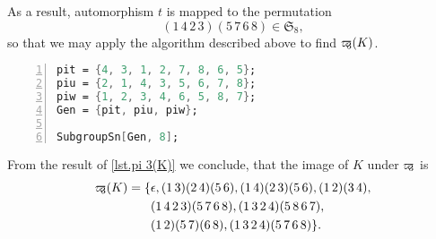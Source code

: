 As a result, automorphism $t$ is mapped to the permutation 
\begin{equation*}
(1\,4\,2\,3)(5\,7\,6\,8)\in\mathfrak{S}_8,
\end{equation*}
so that we may apply the algorithm described above to find $\varpi\hspace{-0.4em}_3(K)$.
\begin{lstlisting}[float, caption=Computing $\varpikern_3(K)\subseteq\mathfrak{S}_8$,
                   label=lst.pi 3(K),
                   language=Mathematica, 
                   numbers=left,
                   numberstyle=\tiny,
                   stepnumber=2,
                   numbersep=5pt]
pit = {4, 3, 1, 2, 7, 8, 6, 5};
piu = {2, 1, 4, 3, 5, 6, 7, 8};
piw = {1, 2, 3, 4, 6, 5, 8, 7};
Gen = {pit, piu, piw};

SubgroupSn[Gen, 8];
\end{lstlisting}
From the result of \cref{lst.pi 3(K)} we conclude, that the image of $K$ under $\varpi\hspace{-0.4em}_3$ is
\begin{align*}
\varpi\hspace{-0.4em}_3(K)=\lbrace	&\epsilon,(1\, 3)(2\, 4)(5\, 6), (1\, 4)(2\, 3)(5\, 6), (1\, 2)(3\, 4),   \\
									&(1\, 4\, 2\, 3)(5\, 7\, 6\, 8), (1\, 3\, 2\, 4)(5\, 8\, 6\, 7), \\
									&(1\, 2)(5\, 7)(6\, 8),   (1\, 3\, 2\, 4)(5\, 7\, 6\, 8)\rbrace.
\end{align*}